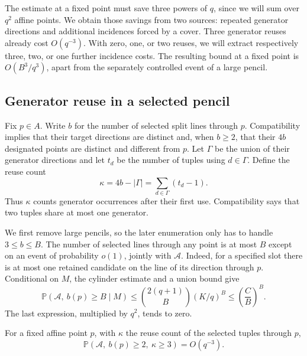 The estimate at a fixed point must save three powers of $q$, since we
will sum over $q^2$ affine points.  We obtain those savings from two
sources: repeated generator directions and additional incidences forced
by a cover.  Three generator reuses already cost $O(q^{-3})$.  With zero,
one, or two reuses, we will extract respectively three, two, or one
further incidence costs.  The resulting bound at a fixed point is
$O(B^3/q^3)$, apart from the separately controlled event of a large pencil.

\subsection{Generator reuse in a selected pencil}

Fix $p\in A$.  Write $b$ for the number of selected split lines through
$p$.  Compatibility implies that their target directions are distinct and,
when $b\ge2$, that their $4b$ designated points are distinct and different
from $p$.  Let $\Gamma$ be the union of their generator directions and let
$t_d$ be the number of tuples using $d\in\Gamma$.  Define the reuse count
\[
 \kappa=4b-|\Gamma|=\sum_{d\in\Gamma}(t_d-1).
\]
Thus $\kappa$ counts generator occurrences after their first use.
Compatibility says that two tuples share at most one generator.

We first remove large pencils, so the later enumeration only has to handle
$3\le b\le B$.  The number of selected lines through any point is at most
$B$ except on an event of probability $o(1)$, jointly with $\mathcal A$.
Indeed, for a
specified slot there is at most one retained candidate on the line of its
direction through $p$.  Conditional on $M$, the cylinder estimate and a
union bound give
\[
 \mathbb P(\mathcal A,\ b(p)\ge B\mid M)
 \le \binom{2(q+1)}B(K/q)^B
 \le \left(\frac{C}{B}\right)^B.
\]
The last expression, multiplied by $q^2$, tends to zero.

\begin{lemma}\label{lem:pencil-reuse}
For a fixed affine point $p$, with $\kappa$ the reuse count of the
selected tuples through $p$,
\[
 \mathbb P(\mathcal A,\ b(p)\ge2,\ \kappa\ge3)=O(q^{-3}).
\]
\end{lemma}

